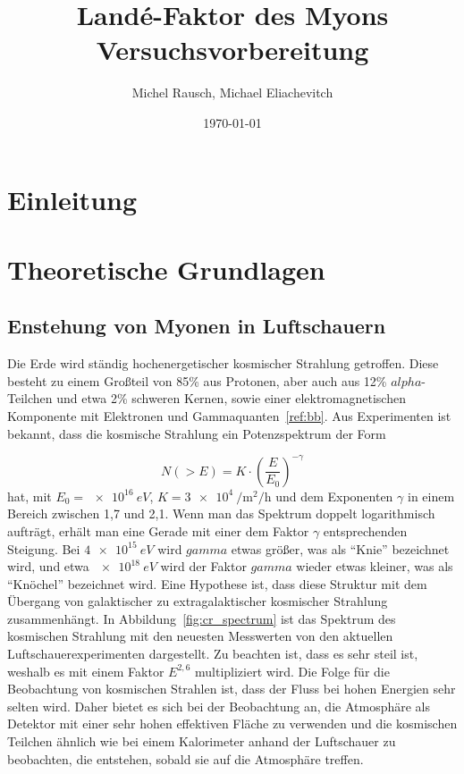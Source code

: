 \documentclass[a4paper,ngerman]{scrartcl}
\title{Landé-Faktor des Myons\\Versuchsvorbereitung}
\date{\today}
\author{Michel Rausch, Michael Eliachevitch}
\begin{document}
\maketitle
\tableofcontents
\newpage

\section{Einleitung}
\label{sec:einfuhrung}


\section{Theoretische Grundlagen}
\label{sec:theorie}

\subsection{Enstehung von Myonen in Luftschauern}
\label{sec:luftschauer}

Die Erde wird ständig hochenergetischer kosmischer Strahlung getroffen. 
Diese besteht zu einem Großteil von 85\% aus Protonen, aber auch aus 12\% $alpha$-Teilchen und etwa 2\% schweren Kernen,
sowie einer elektromagnetischen Komponente mit Elektronen und Gammaquanten~\ref{ref:bb}.
Aus Experimenten ist bekannt, dass die kosmische Strahlung ein Potenzspektrum der Form

\begin{equation}
  N(> E) = K \cdot \left(\frac{E}{E_0}\right)^{-\gamma}
  \label{eq:powerlaw}
\end{equation}
hat, mit $E_0 = \SI{e16}{eV}$, $K = \SI{3e4}{\per\square\meter\per\hour}$ und dem Exponenten $\gamma$ in einem Bereich zwischen 1,7 und 2,1.
Wenn man das Spektrum doppelt logarithmisch aufträgt, erhält man eine Gerade mit einer dem Faktor $\gamma$ entsprechenden Steigung.
Bei $\SI{4e15}{eV}$ wird $gamma$ etwas größer, was als "`Knie"' bezeichnet wird, und etwa $\SI{e18}{eV}$ wird der Faktor $gamma$ wieder etwas kleiner, was als "`Knöchel"' bezeichnet wird. Eine Hypothese ist, dass diese Struktur mit dem Übergang von galaktischer zu extragalaktischer kosmischer Strahlung zusammenhängt. In Abbildung~\ref{fig:cr_spectrum} ist das Spektrum des kosmischen Strahlung mit den neuesten Messwerten von den aktuellen Luftschauerexperimenten dargestellt. Zu beachten ist, dass es sehr steil ist, weshalb es mit einem Faktor $E^{2,6}$ multipliziert wird. Die Folge für die Beobachtung von kosmischen Strahlen ist, dass der Fluss bei hohen Energien sehr selten wird. Daher bietet es sich bei der
Beobachtung an, die Atmosphäre als Detektor mit einer sehr hohen effektiven Fläche zu verwenden und die kosmischen Teilchen ähnlich wie bei einem Kalorimeter anhand der Luftschauer zu beobachten, die entstehen, sobald sie auf die Atmosphäre treffen.
 
\end{document}
